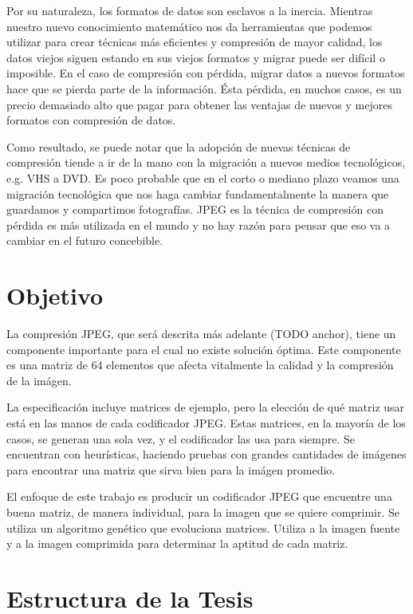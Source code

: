 Por su naturaleza, los formatos de datos son esclavos a la inercia. Mientras nuestro nuevo conocimiento matemático nos da herramientas que podemos utilizar para crear técnicas más eficientes y compresión de mayor calidad, los datos viejos siguen estando en sus viejos formatos y migrar puede ser difícil o imposible. En el caso de compresión con pérdida, migrar datos a nuevos formatos hace que se pierda parte de la información. Ésta pérdida, en muchos casos, es un precio demasiado alto que pagar para obtener las ventajas de nuevos y mejores formatos con compresión de datos.

Como resultado, se puede notar que la adopción de nuevas técnicas de compresión tiende a ir de la mano con la migración a nuevos medios tecnológicos, e.g. VHS a DVD. Es poco probable que en el corto o mediano plazo veamos una migración tecnológica que nos haga cambiar fundamentalmente la manera que guardamos y compartimos fotografías. JPEG es la técnica de compresión con pérdida es más utilizada en el mundo y no hay razón para pensar que eso va a cambiar en el futuro concebible.

\section{Objetivo}

La compresión JPEG, que será descrita más adelante (TODO anchor), tiene un componente importante para el cual no existe solución óptima. Este componente es una matriz de 64 elementos que afecta vitalmente la calidad y la compresión de la imágen.

La especificación incluye matrices de ejemplo, pero la elección de qué matriz usar está en las manos de cada codificador JPEG. Estas matrices, en la mayoría de los casos, se generan una sola vez, y el codificador las usa para siempre. Se encuentran con heurísticas, haciendo pruebas con grandes cantidades de imágenes para encontrar una matriz que sirva bien para la imágen promedio.

El enfoque de este trabajo es producir un codificador JPEG que encuentre una buena matriz, de manera individual, para la imagen que se quiere comprimir. Se utiliza un algoritmo genético que evoluciona matrices. Utiliza a la imagen fuente y a la imagen comprimida para determinar la aptitud de cada matriz.





\section{Estructura de la Tesis}
